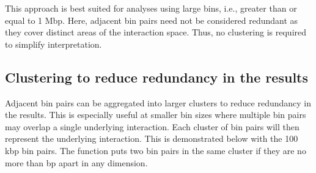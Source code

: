 \documentclass{report}\usepackage[]{graphicx}\usepackage[usenames,dvipsnames]{color}
\newcommand{\hlnum}[1]{\textcolor[rgb]{0.816,0.125,0.439}{#1}}%
\newcommand{\hlstr}[1]{\textcolor[rgb]{0.251,0.627,0.251}{#1}}%
\newcommand{\hlopt}[1]{\textcolor[rgb]{0,0,0}{#1}}%
\newcommand{\hlstd}[1]{\textcolor[rgb]{0.251,0.251,0.251}{#1}}%
\newcommand{\hlkwb}[1]{\textcolor[rgb]{0,0,0}{#1}}%
\newcommand{\hlkwc}[1]{\textcolor[rgb]{0.251,0.251,0.251}{#1}}%
\newcommand{\hlkwd}[1]{\textcolor[rgb]{0.878,0.439,0.125}{#1}}%
\newenvironment{knitrout}{}{} %
\begin{document}
\begin{knitrout}
\color{fgcolor}
\end{knitrout}

This approach is best suited for analyses using large bins, i.e., greater than or equal to 1 Mbp.
Here, adjacent bin pairs need not be considered redundant as they cover distinct areas of the interaction space.
Thus, no clustering is required to simplify interpretation.

\subsection{Clustering to reduce redundancy in the results}
Adjacent bin pairs can be aggregated into larger clusters to reduce redundancy in the results.
This is especially useful at smaller bin sizes where multiple bin pairs may overlap a single underlying interaction.
Each cluster of bin pairs will then represent the underlying interaction.
This is demonstrated below with the 100 kbp bin pairs.
The  function puts two bin pairs in the same cluster if they are no more than  bp apart in any dimension.
\end{document}
